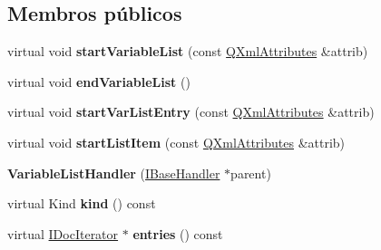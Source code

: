 \subsection*{Membros públicos}
\begin{DoxyCompactItemize}
\item 
\hypertarget{class_variable_list_handler_a41323d0f7798eee31fff5dc7acd7b892}{virtual void {\bfseries start\-Variable\-List} (const \hyperlink{class_q_xml_attributes}{Q\-Xml\-Attributes} \&attrib)}\label{class_variable_list_handler_a41323d0f7798eee31fff5dc7acd7b892}

\item 
\hypertarget{class_variable_list_handler_a7c20803af73a736045f3203141293029}{virtual void {\bfseries end\-Variable\-List} ()}\label{class_variable_list_handler_a7c20803af73a736045f3203141293029}

\item 
\hypertarget{class_variable_list_handler_aeb8206ccc87413e840f5136c28ecf915}{virtual void {\bfseries start\-Var\-List\-Entry} (const \hyperlink{class_q_xml_attributes}{Q\-Xml\-Attributes} \&attrib)}\label{class_variable_list_handler_aeb8206ccc87413e840f5136c28ecf915}

\item 
\hypertarget{class_variable_list_handler_a1d5575fc3ee8b524bd469a184fe15b05}{virtual void {\bfseries start\-List\-Item} (const \hyperlink{class_q_xml_attributes}{Q\-Xml\-Attributes} \&attrib)}\label{class_variable_list_handler_a1d5575fc3ee8b524bd469a184fe15b05}

\item 
\hypertarget{class_variable_list_handler_a8db312a6a14038c580a38f7db629c913}{{\bfseries Variable\-List\-Handler} (\hyperlink{class_i_base_handler}{I\-Base\-Handler} $\ast$parent)}\label{class_variable_list_handler_a8db312a6a14038c580a38f7db629c913}

\item 
\hypertarget{class_variable_list_handler_af8e62c8a81ddf2283205cc8955de50eb}{virtual Kind {\bfseries kind} () const }\label{class_variable_list_handler_af8e62c8a81ddf2283205cc8955de50eb}

\item 
\hypertarget{class_variable_list_handler_a471f34805bf0eb6472512f5c9b5f0d10}{virtual \hyperlink{class_i_doc_iterator}{I\-Doc\-Iterator} $\ast$ {\bfseries entries} () const }\label{class_variable_list_handler_a471f34805bf0eb6472512f5c9b5f0d10}

\end{DoxyCompactItemize}
